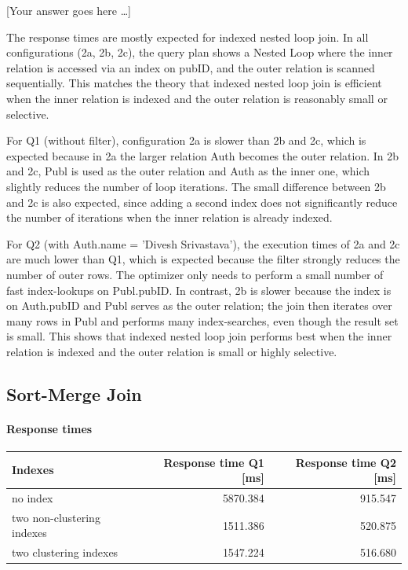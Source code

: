 \documentclass[11pt]{scrartcl}
\newcommand{\youranswerhere}{[Your answer goes here \ldots]}
\begin{document}
\youranswerhere{The response times are mostly expected for indexed nested loop join. In all configurations (2a, 2b, 2c), the query plan shows a Nested Loop where the inner relation is accessed via an index on pubID, and the outer relation is scanned sequentially. This matches the theory that indexed nested loop join is efficient when the inner relation is indexed and the outer relation is reasonably small or selective.

For Q1 (without filter), configuration 2a is slower than 2b and 2c, which is expected because in 2a the larger relation Auth becomes the outer relation. In 2b and 2c, Publ is used as the outer relation and Auth as the inner one, which slightly reduces the number of loop iterations. The small difference between 2b and 2c is also expected, since adding a second index does not significantly reduce the number of iterations when the inner relation is already indexed.

For Q2 (with Auth.name = 'Divesh Srivastava'), the execution times of 2a and 2c are much lower than Q1, which is expected because the filter strongly reduces the number of outer rows. The optimizer only needs to perform a small number of fast index-lookups on Publ.pubID. In contrast, 2b is slower because the index is on Auth.pubID and Publ serves as the outer relation; the join then iterates over many rows in Publ and performs many index-searches, even though the result set is small. This shows that indexed nested loop join performs best when the inner relation is indexed and the outer relation is small or highly selective.}

\subsection*{Sort-Merge Join}

\paragraph{Response times}\mbox{}

\begin{table}[H]
  \centering
  \begin{tabular}{l|r|r}
    Indexes & Response time Q1 [ms] & Response time Q2 [ms] \tabularnewline
    \hline
    no index & 5870.384 & 915.547 \tabularnewline
    two non-clustering indexes & 1511.386 & 520.875 \tabularnewline
    two clustering indexes & 1547.224 & 516.680 \tabularnewline
  \end{tabular}
\end{table}
\end{document}
